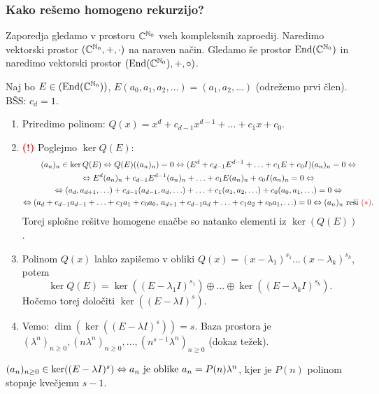 \subsubsection*{Kako rešemo homogeno rekurzijo?}
Zaporedja gledamo v prostoru $\mathbb{C}^{\mathbb{N}_0}$ vseh kompleksnih zaproedij. Naredimo vektorski prostor $(\mathbb{C}^{\mathbb{N}_0}, +, \cdot)$ na naraven način. Gledamo še prostor $\operatorname{End}(\mathbb{C}^{\mathbb{N}_0})$ in naredimo vektorski prostor $(\operatorname{End}(\mathbb{C}^{\mathbb{N}_0}), +, \circ)$.

Naj bo $E \in (\operatorname{End}(\mathbb{C}^{\mathbb{N}_0}))$, $E(a_0, a_1, a_2, \ldots) = (a_1, a_2, \ldots)$ (odrežemo prvi člen). BŠS: $c_d = 1$.
\begin{enumerate}
    \item Priredimo polinom: $Q(x) = x^d + c_{d-1}x^{d-1}+ \ldots + c_1x+c_0$.
    \item \textcolor{red}{\textbf{(!)}} Poglejmo $\ker Q(E)$:
    \begin{multline*}
        (a_n)_{n} \in \ker Q(E) \Leftrightarrow Q(E)((a_n)_n)= 0 \Leftrightarrow (E^d +c_{d-1}E^{d-1}+ \ldots + c_1 E +c_0 I)(a_n)_n = 0 \Leftrightarrow \\ \Leftrightarrow E^d(a_n)_n +c_{d-1}E^{d-1}(a_n)_n + \ldots +  c_1E(a_n)_n + c_0 I (a_n)_n = 0 \Leftrightarrow \\ \Leftrightarrow (a_d, a_{d+1}, \ldots) + c_{d-1}(a_{d-1}, a_d, \ldots) + \ldots + c_1(a_1, a_2, \ldots) + c_0 (a_0, a_1, \ldots) = 0 \Leftrightarrow \\ \Leftrightarrow (a_d +c_{d-1}a_{d-1} + \ldots + c_1a_1 + c_0a_0, \, a_{d+1}+c_{d-1}a_d + \ldots + c_1a_2 + c_0 a_1, \ldots) = 0 \Leftrightarrow (a_n)_n \text{ reši } \textcolor{red}{(*)}.
      \end{multline*}
      Torej splošne rešitve homogene enačbe so natanko elementi iz $\ker(Q(E))$.
      \item Polinom $Q(x)$ lahko zapišemo v obliki $Q(x) = (x-\lambda_1)^{s_1} \ldots (x-\lambda_k)^{s_k}$, potem       
      $$\ker Q(E) = \ker((E - \lambda_1I)^{s_1}) \oplus \ldots \oplus \ker((E - \lambda_kI)^{s_k}).$$
      Hočemo torej določiti $\ker ((E - \lambda I)^{s})$.
      \item Vemo: $\dim (\ker ((E - \lambda I)^{s})) = s$. Baza prostora je $(\lambda^n)_{n \geq 0}, (n\lambda^n)_{n \geq 0}, \ldots, (n^{s-1}\lambda^n)_{n \geq 0}$ (dokaz težek).
\end{enumerate}
\begin{izrek}
    $(a_n)_{n \geq 0} \in \ker ((E - \lambda I)^s) \Leftrightarrow a_n \text{ je oblike } a_n = P(n) \lambda^n$, kjer je $P(n)$ polinom stopnje kvečjemu $s-1$.
\end{izrek}

